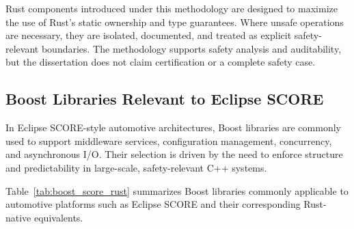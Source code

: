         Rust components introduced under this methodology are designed to maximize the use of Rust's static ownership and type guarantees. Where unsafe operations are necessary, they are isolated, documented, and treated as explicit safety-relevant boundaries. The methodology supports safety analysis and auditability, but the dissertation does not claim certification or a complete safety case.

        \subsection{Boost Libraries Relevant to Eclipse \gls{SCORE}}

        In Eclipse \gls{SCORE}-style automotive architectures, Boost libraries are
        commonly used to support middleware services, configuration management,
        concurrency, and asynchronous I/O. Their selection is driven by the need to
        enforce structure and predictability in large-scale, safety-relevant C++
        systems.

        Table~\ref{tab:boost_score_rust} summarizes Boost libraries commonly applicable
        to automotive platforms such as Eclipse \gls{SCORE} and their corresponding
        Rust-native equivalents.


